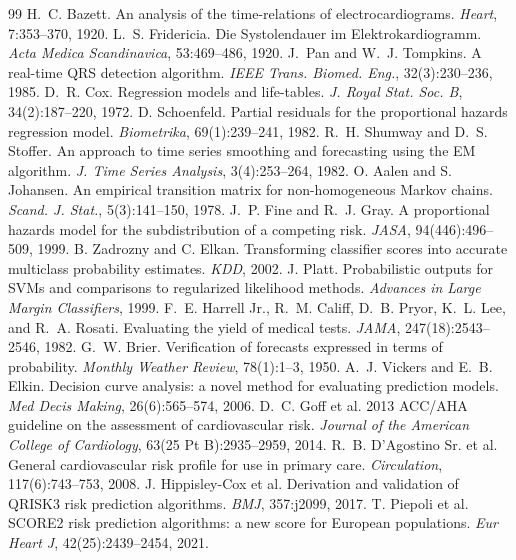 \documentclass[11pt]{article}
\begin{document}
\begin{thebibliography}{99}
 H.~C. Bazett. An analysis of the time-relations of electrocardiograms. \emph{Heart}, 7:353--370, 1920.
 L.~S. Fridericia. Die Systolendauer im Elektrokardiogramm. \emph{Acta Medica Scandinavica}, 53:469--486, 1920.
 J.~Pan and W.~J. Tompkins. A real-time QRS detection algorithm. \emph{IEEE Trans. Biomed. Eng.}, 32(3):230--236, 1985.
 D.~R. Cox. Regression models and life-tables. \emph{J. Royal Stat. Soc. B}, 34(2):187--220, 1972.
 D. Schoenfeld. Partial residuals for the proportional hazards regression model. \emph{Biometrika}, 69(1):239--241, 1982.
 R.~H. Shumway and D.~S. Stoffer. An approach to time series smoothing and forecasting using the EM algorithm. \emph{J. Time Series Analysis}, 3(4):253--264, 1982.
 O. Aalen and S. Johansen. An empirical transition matrix for non-homogeneous Markov chains. \emph{Scand. J. Stat.}, 5(3):141--150, 1978.
 J.~P. Fine and R.~J. Gray. A proportional hazards model for the subdistribution of a competing risk. \emph{JASA}, 94(446):496--509, 1999.
 B. Zadrozny and C. Elkan. Transforming classifier scores into accurate multiclass probability estimates. \emph{KDD}, 2002.
 J. Platt. Probabilistic outputs for SVMs and comparisons to regularized likelihood methods. \emph{Advances in Large Margin Classifiers}, 1999.
 F.~E. Harrell Jr., R.~M. Califf, D.~B. Pryor, K.~L. Lee, and R.~A. Rosati. Evaluating the yield of medical tests. \emph{JAMA}, 247(18):2543--2546, 1982.
 G.~W. Brier. Verification of forecasts expressed in terms of probability. \emph{Monthly Weather Review}, 78(1):1--3, 1950.
 A.~J. Vickers and E.~B. Elkin. Decision curve analysis: a novel method for evaluating prediction models. \emph{Med Decis Making}, 26(6):565--574, 2006.
 D.~C. Goff et al. 2013 ACC/AHA guideline on the assessment of cardiovascular risk. \emph{Journal of the American College of Cardiology}, 63(25 Pt B):2935--2959, 2014.
 R.~B. D'Agostino Sr. et al. General cardiovascular risk profile for use in primary care. \emph{Circulation}, 117(6):743--753, 2008.
 J. Hippisley-Cox et al. Derivation and validation of QRISK3 risk prediction algorithms. \emph{BMJ}, 357:j2099, 2017.
 T. Piepoli et al. SCORE2 risk prediction algorithms: a new score for European populations. \emph{Eur Heart J}, 42(25):2439--2454, 2021.
\end{thebibliography}
\end{document}
